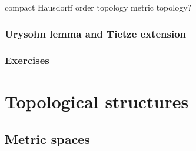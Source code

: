 \documentclass{../../large}
\begin{document}
compact Hausdorff
order topology
metric topology?

\section{Urysohn lemma and Tietze extension}



\section*{Exercises}
\begin{prb}
\end{prb}
\begin{prb}
\end{prb}
\begin{prb}
\end{prb}
\begin{prb}
\end{prb}
\begin{prb}
\end{prb}



\part{Topological structures}

\chapter{Metric spaces}
\end{document}
